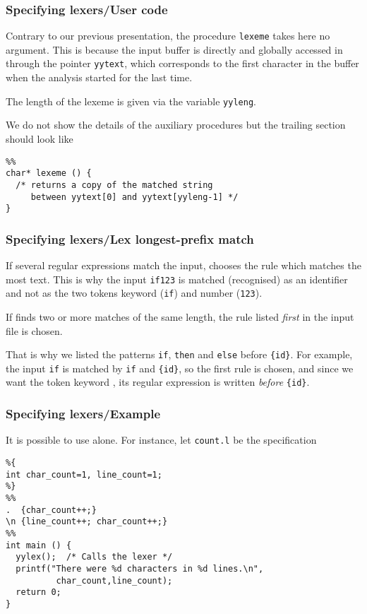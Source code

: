 % 
\begin{frame}[containsverbatim]
\frametitle{Specifying lexers/User code}
 
Contrary to our previous presentation, the procedure \texttt{lexeme}
takes here no argument. This is because the input buffer is directly
and globally accessed in \Lex through the pointer \texttt{yytext},
which corresponds to the first character in the buffer when the
analysis started for the last time.

\bigskip

The length of the lexeme is given via the variable \texttt{yyleng}.

\bigskip

We do not show the details of the auxiliary procedures but the
trailing section should look like
{\small
\begin{verbatim}
%%
char* lexeme () {
  /* returns a copy of the matched string
     between yytext[0] and yytext[yyleng-1] */
}
\end{verbatim}
}

\end{frame}

% 
\begin{frame}[containsverbatim]
\frametitle{Specifying lexers/Lex longest-prefix match}
 
If several regular expressions match the input, \Lex chooses the rule
which matches the most text. This is why the input \verb+if123+ is
matched (recognised) as an identifier and not as the two tokens
keyword (\verb+if+) and number (\verb+123+).

\bigskip

If \Lex finds two or more matches of the same length, the rule listed
\emph{first} in the \Lex input file is chosen.

\bigskip

That is why we listed the patterns \verb+if+, \verb+then+ and
\verb+else+ before \verb+{id}+. For example, the input \verb+if+ is
matched by \verb+if+ and \verb+{id}+, so the first rule is chosen, and
since we want the token keyword , its regular expression is
written \emph{before} \verb+{id}+.

\end{frame}

% 
\begin{frame}[containsverbatim]
\frametitle{Specifying lexers/Example}
 
It is possible to use \Lex alone. For instance, let \texttt{count.l}
be the \Lex specification
{\small 
\begin{verbatim}
%{
int char_count=1, line_count=1;
%}
%%
.  {char_count++;}
\n {line_count++; char_count++;}
%%
int main () {
  yylex();  /* Calls the lexer */
  printf("There were %d characters in %d lines.\n",
          char_count,line_count);
  return 0;
}
\end{verbatim}
}

\end{frame}


